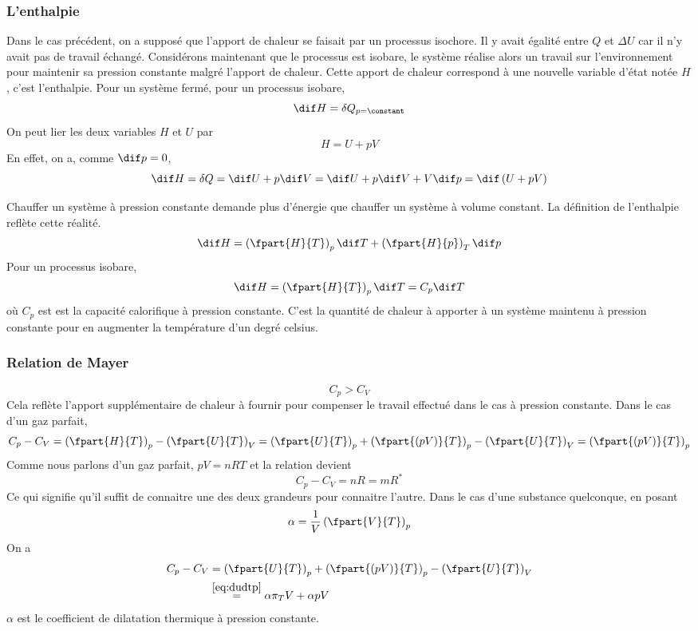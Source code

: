 \subsubsection{L'enthalpie}
Dans le cas précédent, on a supposé que
l'apport de chaleur se faisait par un processus isochore.
Il y avait égalité entre $Q$ et $\Delta U$
car il n'y avait pas de travail échangé.
Considérons maintenant que le processus est isobare,
le système réalise alors un travail sur l'environnement pour maintenir
sa pression constante malgré l'apport de chaleur.
Cette apport de chaleur correspond à une nouvelle variable d'état notée $H$,
c'est l'enthalpie.
Pour un système fermé, pour un processus isobare,
\[ \dif H = \delta Q_{p = \constant} \]
On peut lier les deux variables $H$ et $U$ par
\[ H = U + pV \]
En effet, on a, comme $\dif p = 0$,
\[
  \dif H
  = \delta Q
  = \dif U + p \dif V
  = \dif U + p \dif V + V\dif p
  = \dif \left(U + pV\right) %
\]

Chauffer un système à pression constante demande plus d'énergie
que chauffer un système à volume constant.
La définition de l'enthalpie reflète cette réalité.
\[ \dif H = \left(\fpart{H}{T}\right)_p \dif T +
\left(\fpart{H}{p}\right)_T \dif p \]
Pour un processus isobare,
\[ \dif H = \left(\fpart{H}{T}\right)_p \dif T = C_p\dif T \]
où $C_p$ est est la capacité calorifique à pression constante.
C'est la quantité de chaleur à apporter à un système maintenu à pression
constante pour en augmenter la température d'un degré celsius.


\subsubsection{Relation de Mayer}
\[ C_p > C_V \]
Cela reflète l'apport supplémentaire de chaleur à fournir pour
compenser le travail effectué dans le cas à pression constante.
Dans le cas d'un gaz parfait,
\[ C_p - C_V = \left(\fpart{H}{T}\right)_p -
\left(\fpart{U}{T}\right)_V =
\left(\fpart{U}{T}\right)_p +
\left(\fpart{(pV)}{T}\right)_p -
\left(\fpart{U}{T}\right)_V =
\left(\fpart{(pV)}{T}\right)_p \]
Comme nous parlons d'un gaz parfait,
$pV = nRT$ et la relation devient
\[ C_p - C_V = nR = mR^* \]
Ce qui signifie qu'il suffit de connaitre
une des deux grandeurs pour connaitre l'autre.
Dans le cas d'une substance quelconque, en posant
\[ \alpha = \frac{1}{V} \left(\fpart{V}{T}\right)_p \]
On a
\begin{align*}
  C_p - C_V & =
  \left(\fpart{U}{T}\right)_p +
  \left(\fpart{(pV)}{T}\right)_p -
  \left(\fpart{U}{T}\right)_V\\
  & \stackrel{\eqref{eq:dudtp}}{=} \alpha \pi_T V + \alpha p V
\end{align*}
$\alpha$ est le coefficient de dilatation thermique à pression constante.

